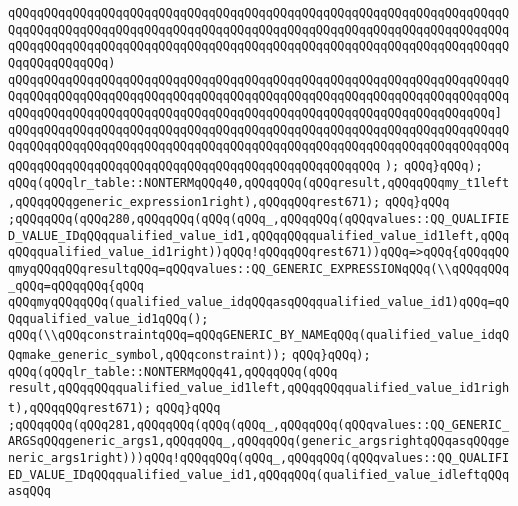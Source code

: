 \verb|qQQqqQQqqQQqqQQqqQQqqQQqqQQqqQQqqQQqqQQqqQQqqQQqqQQqqQQqqQQqqQQqqQQqqQQqqQQqqQQqqQQqqQQqqQQqqQQqqQQqqQQqqQQqqQQqqQQqqQQqqQQqqQQqqQQqqQQqqQQqqQQqqQQqqQQqqQQqqQQqqQQqqQQqqQQqqQQqqQQqqQQqqQQqqQQqqQQqqQQqqQQqqQQqqQQqqQQqqQQqqQQq)|\newline
\verb|qQQqqQQqqQQqqQQqqQQqqQQqqQQqqQQqqQQqqQQqqQQqqQQqqQQqqQQqqQQqqQQqqQQqqQQqqQQqqQQqqQQqqQQqqQQqqQQqqQQqqQQqqQQqqQQqqQQqqQQqqQQqqQQqqQQqqQQqqQQqqQQqqQQqqQQqqQQqqQQqqQQqqQQqqQQqqQQqqQQqqQQqqQQqqQQqqQQqqQQqqQQqqQQq]|\newline
\verb|qQQqqQQqqQQqqQQqqQQqqQQqqQQqqQQqqQQqqQQqqQQqqQQqqQQqqQQqqQQqqQQqqQQqqQQqqQQqqQQqqQQqqQQqqQQqqQQqqQQqqQQqqQQqqQQqqQQqqQQqqQQqqQQqqQQqqQQqqQQqqQQqqQQqqQQqqQQqqQQqqQQqqQQqqQQqqQQqqQQqqQQqqQQqqQQq|\newline
\verb|);|\newline
\verb|qQQq}qQQq);|\newline
\verb|qQQq(qQQqlr_table::NONTERMqQQq40,qQQqqQQq(qQQqresult,qQQqqQQqmy_t1left,qQQqqQQqgeneric_expression1right),qQQqqQQqrest671);|\newline
\verb|qQQq}qQQq|\newline
\verb|;qQQqqQQq(qQQq280,qQQqqQQq(qQQq(qQQq_,qQQqqQQq(qQQqvalues::QQ_QUALIFIED_VALUE_IDqQQqqualified_value_id1,qQQqqQQqqualified_value_id1left,qQQqqQQqqualified_value_id1right))qQQq!qQQqqQQqrest671))qQQq=>qQQq{qQQqqQQqmyqQQqqQQqresultqQQq=qQQqvalues::QQ_GENERIC_EXPRESSIONqQQq(\\qQQqqQQq_qQQq=qQQqqQQq{qQQq|\newline
\verb|qQQqmyqQQqqQQq(qualified_value_idqQQqasqQQqqualified_value_id1)qQQq=qQQqqualified_value_id1qQQq();|\newline
\verb|qQQq(\\qQQqconstraintqQQq=qQQqGENERIC_BY_NAMEqQQq(qualified_value_idqQQqmake_generic_symbol,qQQqconstraint));|\newline
\verb|qQQq}qQQq);|\newline
\verb|qQQq(qQQqlr_table::NONTERMqQQq41,qQQqqQQq(qQQq|\newline
\verb|result,qQQqqQQqqualified_value_id1left,qQQqqQQqqualified_value_id1right),qQQqqQQqrest671);|\newline
\verb|qQQq}qQQq|\newline
\verb|;qQQqqQQq(qQQq281,qQQqqQQq(qQQq(qQQq_,qQQqqQQq(qQQqvalues::QQ_GENERIC_ARGSqQQqgeneric_args1,qQQqqQQq_,qQQqqQQq(generic_argsrightqQQqasqQQqgeneric_args1right)))qQQq!qQQqqQQq(qQQq_,qQQqqQQq(qQQqvalues::QQ_QUALIFIED_VALUE_IDqQQqqualified_value_id1,qQQqqQQq(qualified_value_idleftqQQqasqQQq|\newline
